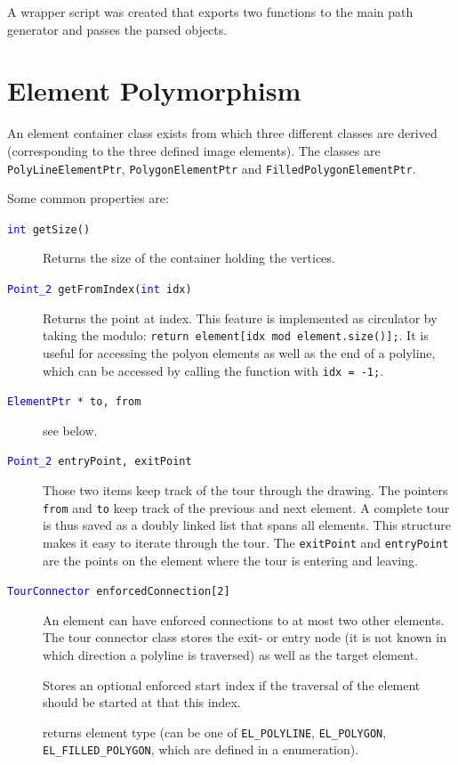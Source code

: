 A wrapper script was created that exports two functions to the main path generator and passes the parsed objects.	

\section{Element Polymorphism}\label{sec:elem}

An element container class exists from which three different classes are derived (corresponding to the three defined image elements). The classes are \texttt{PolyLineElementPtr}, \texttt{PolygonElementPtr} and \texttt{FilledPolygonElementPtr}.

Some common properties are:

\begin{description}

\item[\texttt{\textcolor{blue}{int} getSize()}] Returns the size of the container holding the vertices.

\item[\texttt{\textcolor{blue}{Point\_2} getFromIndex(\textcolor{blue}{int} idx)}] Returns the point at index. This feature is implemented as circulator by taking the modulo: 
\texttt{return element[idx mod element.size()];}. 
It is useful for accessing the polyon elements as well as the end of a polyline, which can be accessed by calling the
function with \texttt{idx = -1;}.

\item[\texttt{\textcolor{blue}{ElementPtr} * to, from}] see below.
\item[\texttt{\textcolor{blue}{Point\_2} entryPoint, exitPoint}] Those two items keep track of the tour through the drawing. The pointers \texttt{from} and \texttt{to} keep track of the previous and next element. A complete tour is thus saved as a doubly linked list that spans all elements. This structure makes it easy to iterate through the tour.
The \texttt{exitPoint} and \texttt{entryPoint} are the points on the element where the tour is entering and leaving.

\item[\texttt{\textcolor{blue}{TourConnector} enforcedConnection[2]}] An element can have enforced connections to at most two other elements. The tour connector class stores the exit- or entry node (it is not known in which direction a polyline is traversed) as well as the target element.

\item[] Stores an optional enforced start index if the traversal of the element should be started at that this index.

\item[] returns element type (can be one of \texttt{EL\_POLYLINE}, \texttt{EL\_POLYGON}, \texttt{EL\_FILLED\_POLYGON}, which are defined in a enumeration).

\end{description}

